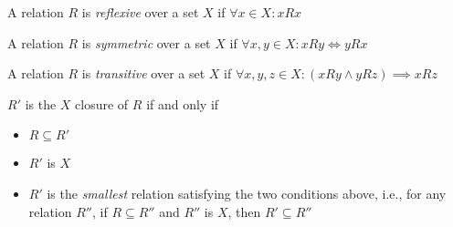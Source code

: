 \begin{definition}[Reflexive]
	A relation $ R $ is \emph{reflexive} over a set $ X $ if $ \forall x \in X : xRx $
\end{definition}
\begin{definition}[Symmetric]
	A relation $ R $ is \emph{symmetric} over a set $ X $ if $ \forall x,y\in X : xRy \iff yRx $
\end{definition}
\begin{definition}[Transitive]
	A relation $ R $ is \emph{transitive} over a set $ X $ if $ \forall x,y,z\in X : (xRy \land yRz) \implies xRz $
\end{definition}
\begin{definition}[Closure]
	$ R' $ is the $ X $ closure of $ R $ if and only if
	\begin{itemize}
		\item $ R\subseteq R' $
		\item $ R' $ is $ X $
		\item $ R' $ is the \emph{smallest} relation satisfying the two conditions above, i.e., for any relation $ R'' $, if $ R\subseteq R'' $ and $ R'' $ is $ X $, then $ R'\subseteq R'' $
	\end{itemize}
\end{definition}